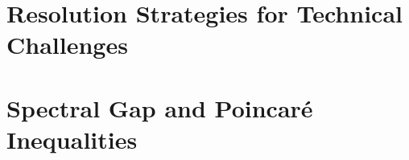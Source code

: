 \documentclass[11pt,a4paper]{report}
\begin{document}
\chapter{Resolution Strategies for Technical Challenges}
\label{ch:gap-resolution}




















\chapter{Spectral Gap and Poincar\'e Inequalities}
\label{ch:spectral-gap}







\end{document}
